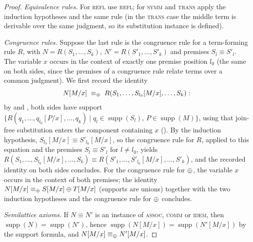 \begin{proof}
\emph{Equivalence rules.}
For \textsc{refl} use \textsc{refl}; for \textsc{symm} and \textsc{trans} apply the induction hypotheses and the same rule (in the \textsc{trans} case the middle term is derivable over the same judgment, so its substitution instance is defined).

\emph{Congruence rules.}
Suppose the last rule is the congruence rule for a term-forming rule $R$, with $N = R(S_1, \ldots, S_k)$, $N' = R(S'_1, \ldots, S'_k)$ and premises $S_l \equiv S'_l$.
The variable $x$ occurs in the context of exactly one premise position $l_0$ (the same on both sides, since the premises of a congruence rule relate terms over a common judgment).
We first record the identity
\[
N[M/x] \;\equiv_{\mathbin{\oplus}}\; R(S_1, \ldots, S_{l_0}[M/x], \ldots, S_k):
\]
by  and , both sides have support $\{ R(q_1, \ldots, q_{l_0}[P/x], \ldots, q_k) \mid q_l \in \operatorname{supp}(S_l),\, P \in \operatorname{supp}(M) \}$, using that join-free substitution enters the component containing $x$ ().
By the induction hypothesis, $S_{l_0}[M/x] \equiv S'_{l_0}[M/x]$, so the congruence rule for $R$, applied to this equation and the premises $S_l \equiv S'_l$ for $l \neq l_0$, yields
$R(S_1, \ldots, S_{l_0}[M/x], \ldots, S_k) \equiv R(S'_1, \ldots, S'_{l_0}[M/x], \ldots, S'_k)$, and the recorded identity on both sides concludes.
For the congruence rule for $\mathbin{\oplus}$, the variable $x$ occurs in the context of both premises; the identity $N[M/x] \equiv_{\mathbin{\oplus}} S[M/x] \mathbin{\oplus} T[M/x]$ (supports are unions) together with the two induction hypotheses and the congruence rule for $\mathbin{\oplus}$ concludes.

\emph{Semilattice axioms.}
If $N \equiv N'$ is an instance of \textsc{assoc}, \textsc{comm} or \textsc{idem}, then $\operatorname{supp}(N) = \operatorname{supp}(N')$, hence $\operatorname{supp}(N[M/x]) = \operatorname{supp}(N'[M/x])$ by the support formula, and $N[M/x] \equiv_{\mathbin{\oplus}} N'[M/x]$.


\end{proof}
